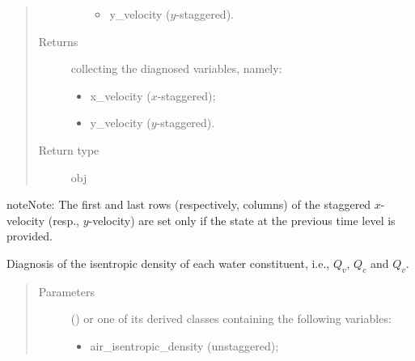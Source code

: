 \documentclass[letterpaper,10pt,english]{sphinxmanual}
\begin{document}
\begin{fulllineitems}
\begin{fulllineitems}
\begin{quote}
\begin{description}
\begin{itemize}
\begin{itemize}
\item {} 
y\_velocity (\(y\)-staggered).

\end{itemize}


\end{itemize}

\item[{Returns}] \leavevmode

{\hyperref[\detokenize{api:tasmania.storages.grid_data.GridData}]{}} collecting the diagnosed variables, namely:
\begin{itemize}
\item {} 
x\_velocity (\(x\)-staggered);

\item {} 
y\_velocity (\(y\)-staggered).

\end{itemize}


\item[{Return type}] \leavevmode
obj

\end{description}\end{quote}

\begin{sphinxadmonition}{note}{Note:}
The first and last rows (respectively, columns) of the staggered \(x\)-velocity (resp., \(y\)-velocity)
are set only if the state at the previous time level is provided.
\end{sphinxadmonition}

\end{fulllineitems}


\begin{fulllineitems}
\label{\detokenize{api:tasmania.dycore.diagnostic_isentropic.DiagnosticIsentropic.get_water_constituents_isentropic_density}}
Diagnosis of the isentropic density of each water constituent, i.e., \(Q_v\), \(Q_c\) and \(Q_v\).
\begin{quote}\begin{description}
\item[{Parameters}] \leavevmode
{} () \textendash{} 
{\hyperref[\detokenize{api:tasmania.storages.grid_data.GridData}]{}} or one of its derived classes containing the following variables:
\begin{itemize}
\item {} 
air\_isentropic\_density (unstaggered);


\end{itemize}
\end{description}
\end{quote}
\end{fulllineitems}
\end{fulllineitems}
\end{document}
